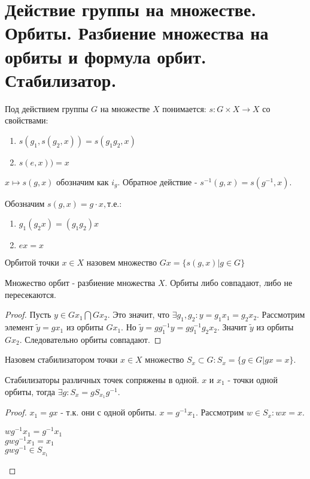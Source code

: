 \section{Действие группы на множестве. Орбиты. Разбиение множества на орбиты и формула орбит. Стабилизатор.}

\begin{defn}
Под действием группы $G$ на множестве $X$ понимается: $s: G \times X \rightarrow X$ со свойствами:
\begin{enumerate}
  \item $s(g_1, s(g_2, x)) = s(g_1 g_2, x)$
  \item $s(e, x)) = x$
\end{enumerate}
\end{defn}

\vspace{0.5cm}
$x \mapsto s(g, x)$ обозначим как $i_g$. Обратное действие - $s^{-1}(g, x) = s(g^{-1}, x)$. \\
\par Обозначим $s(g, x) = g \cdot x, т.е.:$
\begin{enumerate}
 \item $g_1(g_2x) = (g_1g_2)x$
 \item $ex = x$
\end{enumerate}

\begin{defn}
Орбитой точки $x \in X$ назовем множество $Gx = \{ s(g, x) | g \in G \}$
\end{defn}

\begin{lem}
Множество орбит - разбиение множества $X$. Орбиты либо совпадают, либо не пересекаются.
\end{lem}
\begin{proof}
Пусть $y \in G{x_1} \bigcap G{x_2}$. Это значит, что $ \exists g_1, g_2: y = g_1x_1 = g_2x_2$.
Рассмотрим элемент $\widetilde{y} = gx_1$ из орбиты $G{x_1}$. Но $\widetilde{y} = gg^{-1}_1y = gg^{-1}_1g_2x_2$. 
Значит $\widetilde{y}$ из орбиты $G{x_2}$. Следовательно орбиты совпадают.
\end{proof}

\begin{defn}
Назовем стабилизатором точки $x \in X$ множество $S_x \subset G: S_x = \{g \in G | gx = x \}$.
\end{defn}

\begin{lem}
Стабилизаторы различных точек сопряжены в одной. $x$ и $x_1$ - точки одной орбиты,
тогда $\exists g: S_x = gS_{x_1}g^{-1}$.
\end{lem}
\begin{proof}
$x_1 = gx$ - т.к. они с одной орбиты. $x = g^{-1}x_1$. Рассмотрим $w \in S_x: wx = x$. 
\begin{center}
$wg^{-1}x_1 = g^{-1}x_1$\\
$gwg^{-1}x_1 = x_1$\\
$gwg^{-1} \in S_{x_1}$
\end{center}
\end{proof}


